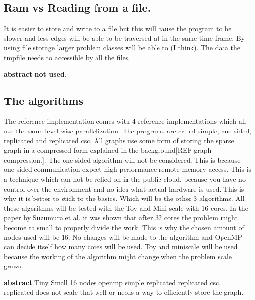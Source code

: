 \subsection{Ram vs Reading from a file.}
It is easier to store and write to a file but this will cause the program to be slower and less edges will be able to be traversed at in the same time frame. By using file storage larger problem classes will be able to (I think). The data the tmpfile needs to accessible by all the files.

\textbf{abstract not used.}

\subsection{The algorithms}
The reference implementation comes with 4 reference implementations which all use the same level wise parallelization. The programs are  called simple, one sided, replicated and replicated csc. All graphs use some form of storing the sparse graph in a compressed form explained in the background[REF graph compression.]. The one sided algorithm will not be considered. This is because one sided communication expect high performance remote memory access. This is a technique which can not be relied on in the public cloud, because you have no control over the environment and no idea what actual hardware is used. This is why it is better to stick to the basics. Which will be the other 3 algorithms.
All these algorithms will be tested with the Toy and Mini scale with 16 cores. In the paper by Suzumura et al. \cite{suzumura2011performance} it was shown that after 32 cores the problem might become to small to properly divide the work. This is why the chosen amount of nodes used will be 16. No changes will be made to the algorithm and OpenMP can decide itself how many cores will be used. Toy and miniscale will be used because the working of the algorithm might change when the problem scale grows.

\textbf{abstract}
Tiny Small 16 nodes openmp simple replicated replicated csc. replicated does not scale that well or needs a way to efficiently store the graph. 


